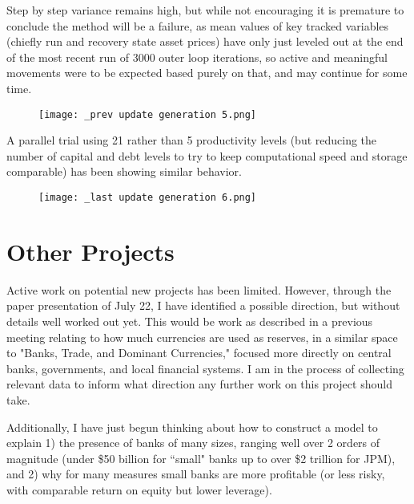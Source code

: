 \documentclass[english]{article}
\begin{document}
Step by step variance remains high, but while not encouraging it is premature to conclude the method
will be a failure, as mean values of key tracked variables (chiefly run and recovery state asset prices) 
have only just leveled out at the end of the most recent run of 3000 outer loop iterations, so active 
and meaningful movements were to be expected based purely on that, and may continue for some time.

\begin{figure}[H]
\centering
		\texttt{[image: \_prev update generation 5.png]}
\end{figure}

A parallel trial using 21 rather than 5 productivity levels (but reducing the number of capital and 
debt levels to try to keep computational speed and storage comparable) has been showing similar 
behavior. 

\begin{figure}[H]
\centering
		\texttt{[image: \_last update generation 6.png]}
\end{figure}

\section{Other Projects}
Active work on potential new projects has been limited. However, through the paper presentation of 
July 22, I have identified a possible direction, but without details well worked out yet. This would be work as described in a previous meeting 
relating to how much currencies are used as reserves, in a similar space to "Banks, Trade, and Dominant Currencies," 
focused more directly on central banks, governments, and local financial systems. I am in the process of 
collecting relevant data to inform what direction any further work on this project should take. 

Additionally, I have just begun thinking about how to construct a model to explain 1) the presence of 
banks of many sizes, ranging well over 2 orders of magnitude (under \$50 billion for ``small" banks 
up to over \$2 trillion for JPM), and 2) why for many measures small banks are more profitable (or 
less risky, with comparable return on equity but lower leverage). 
\end{document}
